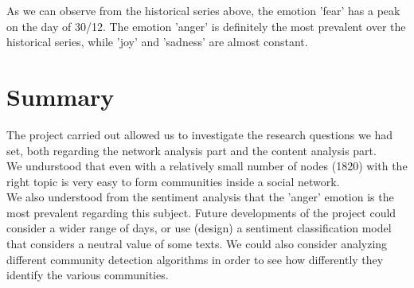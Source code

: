 \documentclass[12pt,journal,compsoc]{IEEEtran}
\begin{document}
As we can observe from the historical series above, the emotion 'fear' has a peak on the day of 30/12. The emotion 'anger' is definitely the most prevalent over the historical series, while 'joy' and 'sadness' are almost constant.

\section{Summary}
The project carried out allowed us to investigate the research questions we had set, both regarding the network analysis part and the content analysis part.\\
We undurstood that even with a relatively small number of nodes (1820) with the right topic is very easy to form communities inside a social network.\\
We also understood from the sentiment analysis that the 'anger' emotion is the most prevalent regarding this subject.
Future developments of the project could consider a wider range of days, or use (design) a sentiment classification model that considers a neutral value of some texts. We could also consider analyzing different community detection algorithms in order to see how differently they identify the various communities.


\nocite{*}
\printbibliography
\end{document}

